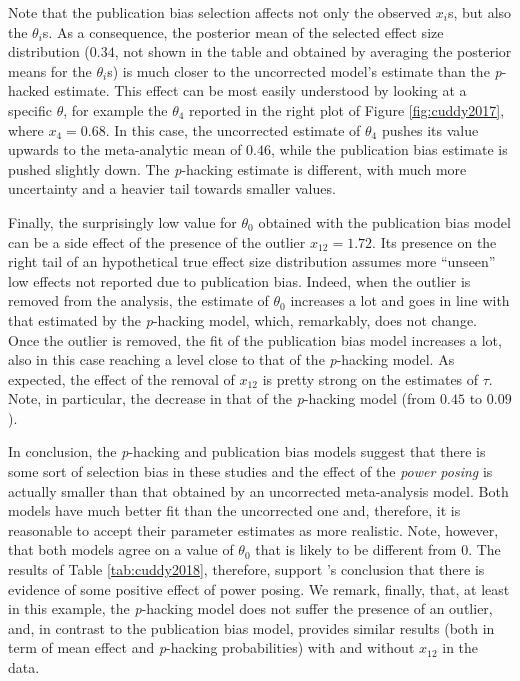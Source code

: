 \documentclass{article}
\theoremstyle{plain}
\theoremstyle{definition}
\begin{document}
Note that the publication bias selection affects not only the observed $x_{i}$s, but also the $\theta_{i}$s. As a consequence, the posterior mean of the selected effect size distribution ($0.34$, not shown in the table and obtained by averaging the posterior means for the $\theta_{i}$s) is much closer to the uncorrected model's estimate than the \textit{p}-hacked estimate. This effect can be most easily understood by looking at a specific $\theta$, for example the $\theta_4$ reported in the right plot of Figure \ref{fig:cuddy2017}, where $x_{4}=0.68$. In this case, the uncorrected estimate of $\theta_{4}$ pushes its value upwards to the meta-analytic mean of $0.46$, while the publication bias estimate is pushed slightly down. The \textit{p}-hacking estimate is different, with much more uncertainty and a heavier tail towards smaller values.

Finally, the surprisingly low value for $\theta_0$ obtained with the publication bias model can be a side effect of the presence of the outlier $x_{12} = 1.72$. Its presence on the right tail of an hypothetical true effect size distribution assumes more ``unseen'' low effects not reported due to publication bias. Indeed, when the outlier is removed from the analysis, the estimate of $\theta_{0}$ increases a lot and goes in line with that estimated by the \textit{p}-hacking model, which, remarkably, does not change. Once the outlier is removed, the fit of the publication bias model increases a lot, also in this case reaching a level close to that of the \textit{p}-hacking model. As expected, the effect of the removal of $x_{12}$ is pretty strong on the estimates of $\tau$. Note, in particular, the decrease in that of the \textit{p}-hacking model (from $0.45$ to $0.09$).



In conclusion, the \textit{p}-hacking and publication bias models suggest that there is some sort of selection bias in these studies and the effect of the \emph{power posing} is actually smaller than that obtained by an uncorrected meta-analysis model. Both models have much better fit than the uncorrected one and, therefore, it is reasonable to accept their parameter estimates as more realistic. Note, however, that both models agree on  a value of $\theta_{0}$ that is likely to be different from $0$. The results of Table \ref{tab:cuddy2018}, therefore, support \citet{cuddy2018p}'s conclusion that there is evidence of some positive effect of power posing. We remark, finally, that, at least in this example, the \textit{p}-hacking model does not suffer the presence of an outlier, and, in contrast to the publication bias model, provides similar results (both in term of mean effect and \textit{p}-hacking probabilities) with and without $x_{12}$ in the data.
\end{document}
